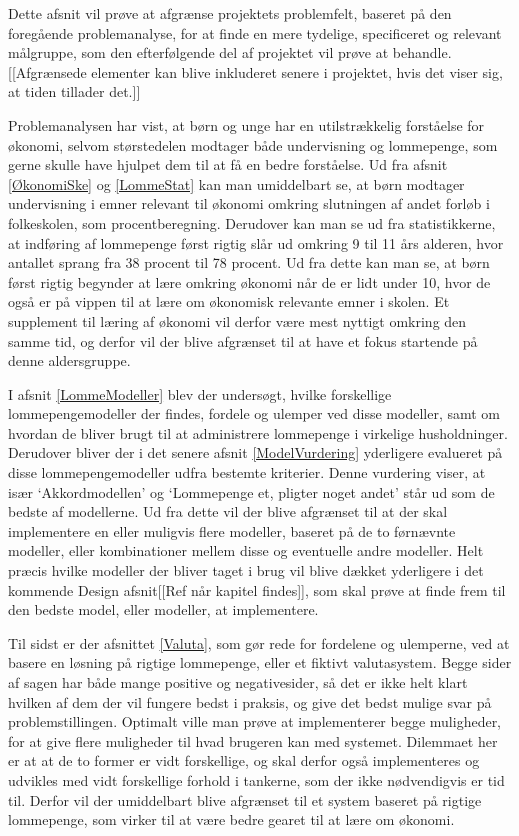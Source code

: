Dette afsnit vil prøve at afgrænse projektets problemfelt, baseret på den foregående problemanalyse, for at finde en mere tydelige, specificeret og relevant målgruppe, som den efterfølgende del af projektet vil prøve at behandle. [[Afgrænsede elementer kan blive inkluderet senere i projektet, hvis det viser sig, at tiden tillader det.]]

Problemanalysen har vist, at børn og unge har en utilstrækkelig forståelse for økonomi, selvom størstedelen modtager både undervisning og lommepenge, som gerne skulle have hjulpet dem til at få en bedre forståelse. Ud fra afsnit \ref{ØkonomiSke} og \ref{LommeStat}  kan man umiddelbart se, at børn modtager undervisning i emner relevant til økonomi omkring slutningen af andet forløb i folkeskolen, som procentberegning. Derudover kan man se ud fra statistikkerne, at indføring af lommepenge først rigtig slår ud omkring 9 til 11 års alderen, hvor antallet sprang fra 38 procent til 78 procent. Ud fra dette kan man se, at børn først rigtig begynder at lære omkring økonomi når de er lidt under 10, hvor de også er på vippen til at lære om økonomisk relevante emner i skolen. Et supplement til læring af økonomi vil derfor være mest nyttigt omkring den samme tid, og derfor vil der blive afgrænset til at have et fokus startende på denne aldersgruppe.

I afsnit \ref{LommeModeller} blev der undersøgt, hvilke forskellige lommepengemodeller der findes, fordele og ulemper ved disse modeller, samt om hvordan de bliver brugt til at administrere lommepenge i virkelige husholdninger. Derudover bliver der i det senere afsnit \ref{ModelVurdering} yderligere evalueret på disse lommepengemodeller udfra bestemte kriterier. Denne vurdering viser, at især ‘Akkordmodellen’ og ‘Lommepenge et, pligter noget andet’ står ud som de bedste af modellerne. Ud fra dette vil der blive afgrænset til at der skal implementere en eller muligvis flere modeller, baseret på de to førnævnte modeller, eller kombinationer mellem disse og eventuelle andre modeller. Helt præcis hvilke modeller der bliver taget i brug vil blive dækket yderligere i det kommende Design afsnit[[Ref når kapitel findes]], som skal prøve at finde frem til den bedste model, eller modeller, at implementere.

Til sidst er der afsnittet \ref{Valuta}, som gør rede for fordelene og ulemperne, ved at basere en løsning på rigtige lommepenge, eller et fiktivt valutasystem. Begge sider af sagen har både mange positive og negativesider, så det er ikke helt klart hvilken af dem der vil fungere bedst i praksis, og give det bedst mulige svar på problemstillingen. Optimalt ville man prøve at implementerer begge muligheder, for at give flere muligheder til hvad brugeren kan med systemet. Dilemmaet her er at at de to former er vidt forskellige, og skal derfor også implementeres og udvikles med vidt forskellige forhold i tankerne, som der ikke nødvendigvis er tid til. Derfor vil der umiddelbart blive afgrænset til et system baseret på rigtige lommepenge, som virker til at være bedre gearet til at lære om økonomi.